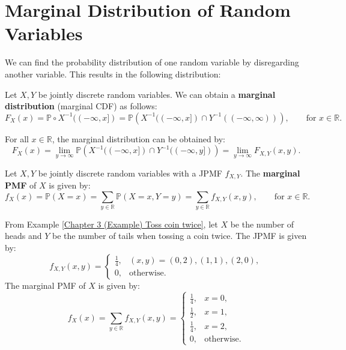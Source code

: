 \documentclass{huhtakm-template-book-v2}
\newcommand{\prob}{\mathbb{P}}
\begin{document}
\section{Marginal Distribution of Random Variables}
    We can find the probability distribution of one random variable by disregarding another variable. This results in the following distribution:
    \begin{defn}
        Let $X,Y$ be jointly discrete random variables. We can obtain a \textbf{marginal distribution} (marginal CDF) as follows:
        \begin{equation*}
            F_{X}(x) = \prob \circ X^{-1}((-\infty,x]) = \prob\left(X^{-1}((-\infty,x])\cap Y^{-1}((-\infty,\infty))\right), \qquad\text{for }x \in \mathbb{R}.
        \end{equation*}
    \end{defn}
    \begin{rem}
        For all $x \in \mathbb{R}$, the marginal distribution can be obtained by:
        \begin{equation*}
            F_{X}(x) = \lim_{y \to \infty}\prob\left(X^{-1}((-\infty,x])\cap Y^{-1}((-\infty,y])\right) = \lim_{y \to \infty}F_{X,Y}(x, y).
        \end{equation*}
    \end{rem}
    \begin{defn}
        Let $X,Y$ be jointly discrete random variables with a JPMF $f_{X,Y}$. The \textbf{marginal PMF} of $X$ is given by:
        \begin{equation*}
            f_{X}(x) = \prob(X = x) = \sum_{y \in \mathbb{R}}\prob(X = x,Y = y) = \sum_{y \in \mathbb{R}}f_{X,Y}(x, y), \qquad\text{for }x \in \mathbb{R}.
        \end{equation*}
    \end{defn}
    \begin{eg}
        From Example \ref{Chapter 3 (Example) Toss coin twice}, let $X$ be the number of heads and $Y$ be the number of tails when tossing a coin twice. The JPMF is given by:
        \begin{equation*}
            f_{X,Y}(x, y) = \begin{cases}
                \frac{1}{4}, &(x, y) = (0,2),(1,1),(2,0),\\
                0, &\text{otherwise}.
            \end{cases}
        \end{equation*}
        The marginal PMF of $X$ is given by:
        \begin{equation*}
            f_{X}(x) = \sum_{y \in \mathbb{R}}f_{X,Y}(x, y) = \begin{cases}
                \frac{1}{4}, &x = 0,\\
                \frac{1}{2}, &x = 1,\\
                \frac{1}{4}, &x = 2,\\
                0, &\text{otherwise}.
            \end{cases}
        \end{equation*}
    \end{eg}
\end{document}
